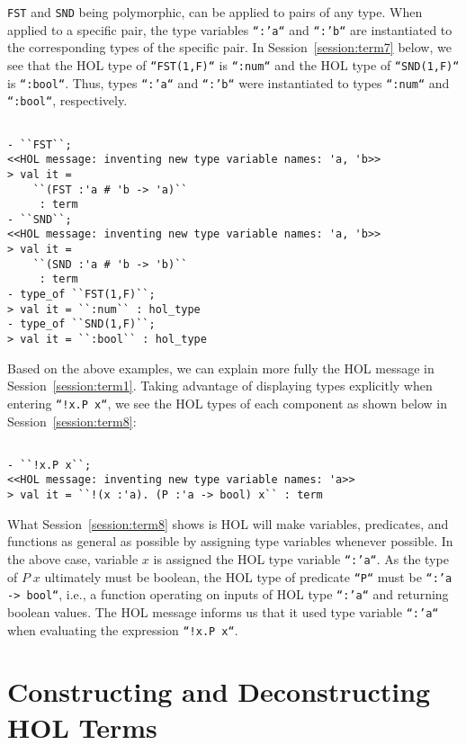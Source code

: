 \texttt{FST} and \texttt{SND} being polymorphic, can be applied to
pairs of any type. When applied to a specific pair, the type variables
\texttt{``:'a``} and \texttt{``:'b``} are instantiated to the
corresponding types of the specific pair. In
Session~\ref{session:term7} below, we see that the HOL type of
\texttt{``FST(1,F)``} is \texttt{``:num``} and the HOL type of
\texttt{``SND(1,F)``} is \texttt{``:bool``}. Thus, types
\texttt{``:'a``} and \texttt{``:'b``} were instantiated to types
\texttt{``:num``} and \texttt{``:bool``}, respectively.
\begin{session}
  \label{session:term7}
\begin{verbatim}

- ``FST``;
<<HOL message: inventing new type variable names: 'a, 'b>>
> val it =
    ``(FST :'a # 'b -> 'a)``
     : term
- ``SND``;
<<HOL message: inventing new type variable names: 'a, 'b>>
> val it =
    ``(SND :'a # 'b -> 'b)``
     : term
- type_of ``FST(1,F)``;
> val it = ``:num`` : hol_type
- type_of ``SND(1,F)``;
> val it = ``:bool`` : hol_type
\end{verbatim}

\end{session}

Based on the above examples, we can explain more fully the HOL message
in Session~\ref{session:term1}. Taking advantage of displaying types
explicitly when entering \texttt{``!x.P x``}, we see the HOL types of each component as shown below in Session~\ref{session:term8}:
\begin{session}
\label{session:term8}
\begin{verbatim}

- ``!x.P x``;
<<HOL message: inventing new type variable names: 'a>>
> val it = ``!(x :'a). (P :'a -> bool) x`` : term
\end{verbatim}
\end{session}
What Session~\ref{session:term8} shows is HOL will make variables,
predicates, and functions as general as possible by assigning type
variables whenever possible. In the above case, variable $x$ is
assigned the HOL type variable \texttt{``:'a``}.  As the type of
$P\;x$ ultimately must be boolean, the HOL type of predicate
\texttt{``P``} must be \texttt{``:'a -> bool``}, i.e., a function
operating on inputs of HOL type \texttt{``:'a``} and returning boolean
values.  The HOL message informs us that it used type variable
\texttt{``:'a``} when evaluating the expression \texttt{``!x.P x``}.

\section{Constructing and Deconstructing HOL Terms}
\label{sec:construction-deconstruction}


